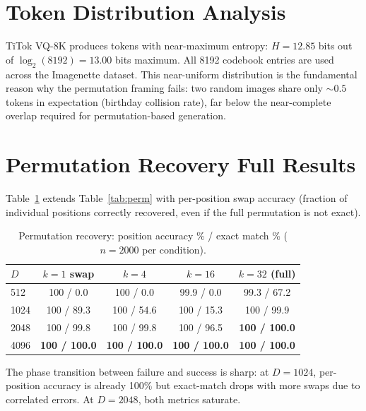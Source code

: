 \documentclass{article}
\begin{document}
\section{Token Distribution Analysis}
\label{app:tokens}

TiTok VQ-8K produces tokens with near-maximum entropy: $H = 12.85$ bits out of $\log_2(8192) = 13.00$ bits maximum.
All 8192 codebook entries are used across the Imagenette dataset.
This near-uniform distribution is the fundamental reason why the permutation framing fails: two random images share only ${\sim}0.5$ tokens in expectation (birthday collision rate), far below the near-complete overlap required for permutation-based generation.

\section{Permutation Recovery Full Results}
\label{app:perm}

Table~\ref{tab:perm_full} extends Table~\ref{tab:perm} with per-position swap accuracy (fraction of individual positions correctly recovered, even if the full permutation is not exact).

\begin{table}[h]
\centering
\caption{Permutation recovery: position accuracy \% / exact match \% ($n{=}2000$ per condition).}
\label{tab:perm_full}
\begin{tabular}{lcccc}
\toprule
$D$ & $k{=}1$ swap & $k{=}4$ & $k{=}16$ & $k{=}32$ (full) \\
\midrule
512 & 100 / 0.0 & 100 / 0.0 & 99.9 / 0.0 & 99.3 / 67.2 \\
1024 & 100 / 89.3 & 100 / 54.6 & 100 / 15.3 & 100 / 99.9 \\
2048 & 100 / 99.8 & 100 / 99.8 & 100 / 96.5 & \textbf{100 / 100.0} \\
4096 & \textbf{100 / 100.0} & \textbf{100 / 100.0} & \textbf{100 / 100.0} & \textbf{100 / 100.0} \\
\bottomrule
\end{tabular}
\end{table}

The phase transition between failure and success is sharp: at $D{=}1024$, per-position accuracy is already 100\% but exact-match drops with more swaps due to correlated errors. At $D{=}2048$, both metrics saturate.
\end{document}
